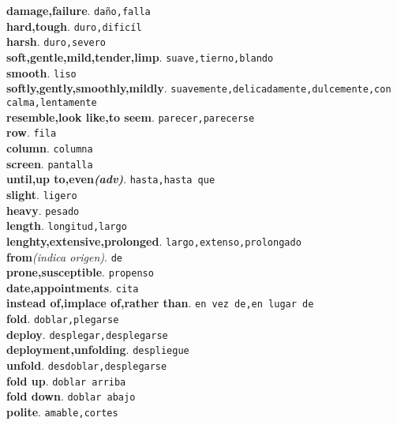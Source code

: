 \documentclass[twocolumn]{article}
\begin{document}
	\textsf{\textbf{damage,failure}}. \texttt{da\~no,falla}\\
	\textsf{\textbf{hard,tough}}. \texttt{duro,dific\'il}\\
	\textsf{\textbf{harsh}}. \texttt{duro,severo}\\
	\textsf{\textbf{soft,gentle,mild,tender,limp}}. \texttt{suave,tierno,blando}\\
	\textsf{\textbf{smooth}}. \texttt{liso}\\
	\textsf{\textbf{softly,gently,smoothly,mildly}}. \texttt{suavemente,delicadamente,dulcemente,con calma,lentamente}\\
	\textsf{\textbf{resemble,look like,to seem}}. \texttt{parecer,parecerse}\\
	\textsf{\textbf{row}}. \texttt{fila}\\
	\textsf{\textbf{column}}. \texttt{columna}\\
	\textsf{\textbf{screen}}. \texttt{pantalla}\\
	\textsf{\textbf{until,up to,even{\scriptsize \textsl{(adv)}}}}. \texttt{hasta,hasta que}\\
	\textsf{\textbf{slight}}. \texttt{ligero}\\
	\textsf{\textbf{heavy}}. \texttt{pesado}\\
	\textsf{\textbf{length}}. \texttt{longitud,largo}\\
	\textsf{\textbf{lenghty,extensive,prolonged}}. \texttt{largo,extenso,prolongado}\\
	\textsf{\textbf{from}}{\scriptsize \textsl{(indica origen)}}. \texttt{de}\\
	\textsf{\textbf{prone,susceptible}}. \texttt{propenso}\\
	\textsf{\textbf{date,appointments}}. \texttt{cita}\\
	\textsf{\textbf{instead of,implace of,rather than}}. \texttt{en vez de,en lugar de}\\
	\textsf{\textbf{fold}}. \texttt{doblar,plegarse}\\
	\textsf{\textbf{deploy}}. \texttt{desplegar,desplegarse}\\
	\textsf{\textbf{deployment,unfolding}}. \texttt{despliegue}\\
	\textsf{\textbf{unfold}}. \texttt{desdoblar,desplegarse}\\
	\textsf{\textbf{fold up}}. \texttt{doblar arriba}\\
	\textsf{\textbf{fold down}}. \texttt{doblar abajo}\\
	\textsf{\textbf{polite}}. \texttt{amable,cortes}\\
\end{document}
